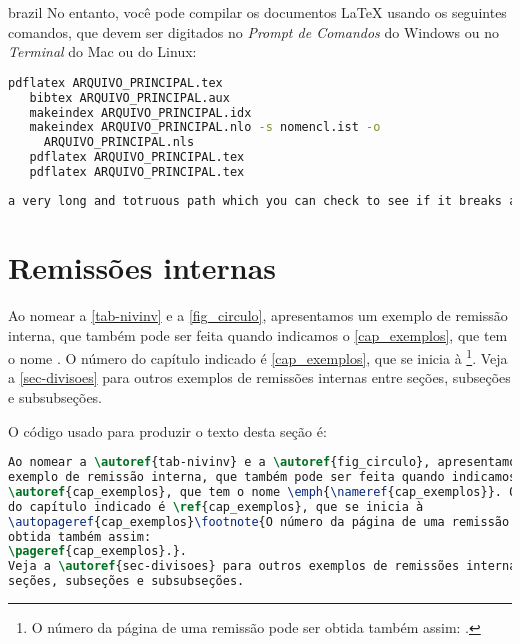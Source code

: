 \begin{otherlanguage*}{brazil}
No entanto, você pode compilar os documentos \LaTeX{} usando os seguintes
comandos, que devem ser digitados no \emph{Prompt de Comandos} do Windows ou no
\emph{Terminal} do Mac ou do Linux:

\begin{lstlisting}[language=bash,caption={Você pode compilar os documentos \LaTeX{} usando os seguintes
comandos.},label={lst:compilarLatex}]
   pdflatex ARQUIVO_PRINCIPAL.tex
   bibtex ARQUIVO_PRINCIPAL.aux
   makeindex ARQUIVO_PRINCIPAL.idx
   makeindex ARQUIVO_PRINCIPAL.nlo -s nomencl.ist -o
     ARQUIVO_PRINCIPAL.nls
   pdflatex ARQUIVO_PRINCIPAL.tex
   pdflatex ARQUIVO_PRINCIPAL.tex
\end{lstlisting}

\begin{lstlisting}[language=bash]
a very long and totruous path which you can check to see if it breaks and where at the end of the line
\end{lstlisting}


\section{Remissões internas}

Ao nomear a \autoref{tab-nivinv} e a \autoref{fig_circulo}, apresentamos um
exemplo de remissão interna, que também pode ser feita quando indicamos o
\autoref{cap_exemplos}, que tem o nome \emph{}. O número
do capítulo indicado é \ref{cap_exemplos}, que se inicia à
\footnote{O número da página de uma remissão pode ser
obtida também assim:
\pageref{cap_exemplos}.}.
Veja a \autoref{sec-divisoes} para outros exemplos de remissões internas entre
seções, subseções e subsubseções.

O código usado para produzir o texto desta seção é:

\begin{lstlisting}[language=TeX, caption=TeX example]
Ao nomear a \autoref{tab-nivinv} e a \autoref{fig_circulo}, apresentamos um
exemplo de remissão interna, que também pode ser feita quando indicamos o
\autoref{cap_exemplos}, que tem o nome \emph{\nameref{cap_exemplos}}. O número
do capítulo indicado é \ref{cap_exemplos}, que se inicia à
\autopageref{cap_exemplos}\footnote{O número da página de uma remissão pode ser
obtida também assim:
\pageref{cap_exemplos}.}.
Veja a \autoref{sec-divisoes} para outros exemplos de remissões internas entre
seções, subseções e subsubseções.
\end{lstlisting}


\end{otherlanguage*}
